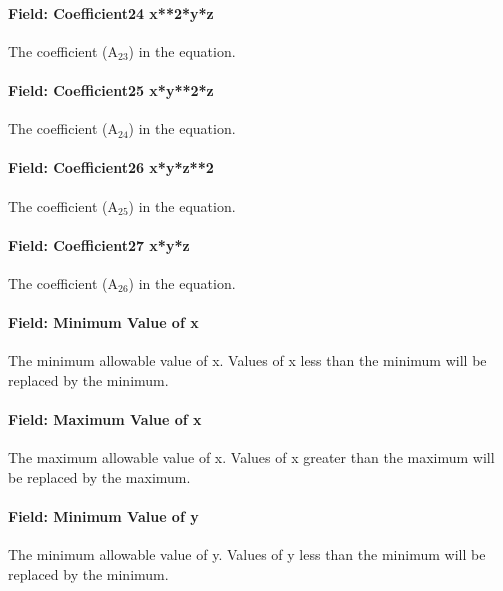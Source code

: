 \paragraph{Field: Coefficient24 x**2*y*z}\label{field-coefficient24-x2yz}

The coefficient (A\(_{23}\)) in the equation.

\paragraph{Field: Coefficient25 x*y**2*z}\label{field-coefficient25-xy2z}

The coefficient (A\(_{24}\)) in the equation.

\paragraph{Field: Coefficient26 x*y*z**2}\label{field-coefficient26-xyz2}

The coefficient (A\(_{25}\)) in the equation.

\paragraph{Field: Coefficient27 x*y*z}\label{field-coefficient27-xyz}

The coefficient (A\(_{26}\)) in the equation.

\paragraph{Field: Minimum Value of x}\label{field-minimum-value-of-x-11}

The minimum allowable value of x. Values of x less than the minimum will be replaced by the minimum.

\paragraph{Field: Maximum Value of x}\label{field-maximum-value-of-x-12}

The maximum allowable value of x. Values of x greater than the maximum will be replaced by the maximum.

\paragraph{Field: Minimum Value of y}\label{field-minimum-value-of-y-6}

The minimum allowable value of y. Values of y less than the minimum will be replaced by the minimum.

